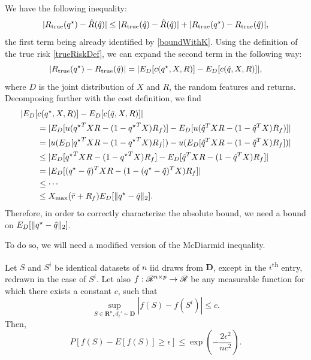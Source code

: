 We have the following inequality:
\begin{equation*}
  |R_{\mathrm{true}}(q^\star)-\hat R(\hat q)| \leq |R_{\mathrm{true}}(\hat q) - \hat R(\hat q)|
                                        + |R_{\mathrm{true}}(q^\star) - R_{\mathrm{true}}(\hat q)|,
\end{equation*}
the first term being already identified by \eqref{boundWithK}. Using the definition of the
true risk \eqref{trueRiskDef}, we can expand the second term in the following way:
\begin{equation*}
  |R_{\mathrm{true}}(q^\star) - R_{\mathrm{true}}(\hat q)| = |E_D[c(q^\star,X,R)] - E_D[c(\hat q,X,R)]|,
\end{equation*}
where $D$ is the joint distribution of $X$ and $R$, the random features and
returns. Decomposing further with the cost definition, we find
\begin{align*}
  &|E_D[c(q^\star,X,R)] - E_D[c(\hat q,X,R)]|\\
  &\qquad = |E_D[u({q^\star}^TXR - (1-{q^\star}^TX)R_f)] - E_D[u({\hat q}^TXR -
    (1-{\hat q}^TX)R_f)]|\\
  &\qquad = |u(E_D[{q^\star}^TXR - (1-{q^\star}^TX)R_f]) - u(E_D[{\hat q}^TXR -
    (1-{\hat q}^TX)R_f])|\\
  &\qquad \leq |E_D[{q^\star}^TXR - (1-{q^\star}^TX)R_f] - E_D[{\hat q}^TXR -
    (1-{\hat q}^TX)R_f]|\\
  &\qquad = |E_D[({q^\star}-{\hat q})^TXR - (1-({q^\star}-{\hat q})^TX)R_f]|\\
  &\qquad \leq \cdots\\
  &\qquad \leq X_{\max}(\bar r + R_f)E_D[\|{q^\star}-{\hat q}\|_2].
\end{align*}
Therefore, in order to correctly characterize the absolute bound, we need a bound on
$E_D[\|{q^\star}-{\hat q}\|_2]$. 

To do so, we will need a modified version of the McDiarmid inequality.

\begin{thm}[McDiarmid]
  Let $S$ and $S^i$ be identical datasets of $n$ iid draws from $\bm D$, except in the
  $i$\textsuperscript{th} entry, redrawn in the case of $S^i$. Let also
  $f: \mathscr{R}^{n\times p}\to\mathscr{R}$ be any measurable function for which there exists a
  constant $c$, such that
  \begin{equation*}
    \sup_{S\in\bm R^n, d_i'\sim\bm D} |f(S) - f(S^i)| \leq c.
  \end{equation*}
  Then, 
  \begin{equation*}
    P[f(S) - E[f(S)] \geq \epsilon] \leq \exp\left(-\frac{2\epsilon^2}{nc^2}\right).
  \end{equation*}
\end{thm}

